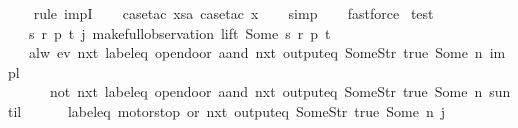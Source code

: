 \begin{isabellebody}
\ \ \isamarkupfalse%
\ {\isacharparenleft}rule\ impI{\isacharparenright}\isanewline
\ \ \isamarkupfalse%
\ {\isacharparenleft}case{\isacharunderscore}tac\ {\isachardoublequoteopen}xsa{\isachardoublequoteclose}{\isacharcomma}\ case{\isacharunderscore}tac\ x{}{\isacharparenright}\isanewline
\ \ \isamarkupfalse%
\ simp\isanewline
\ \ \isamarkupfalse%
\ fastforce%
\endisatagproof
{\isafoldproof}%
%
\isadelimproof
\isanewline
%
\endisadelimproof
\isanewline
{}\isamarkupfalse%
\ test\ {\isacharcolon}\isanewline
\ \ \ {\isachardoublequoteopen}{\isasymexists}s\ r\ p\ t{\isachardot}\ j{\isacharequal}\ make{\isacharunderscore}full{\isacharunderscore}observation\ lift\ {\isacharparenleft}Some\ s{\isacharparenright}\ r\ p\ t{\isachardoublequoteclose}\isanewline
\ \ \ {\isachardoublequoteopen}alw\ {\isacharparenleft}{\isacharparenleft}ev\ {\isacharparenleft}nxt\ {\isacharparenleft}{\isacharparenleft}label{\isacharunderscore}eq\ {\isacharprime}{\isacharprime}opendoor{\isacharprime}{\isacharprime}{\isacharparenright}\ aand\ {\isacharparenleft}nxt\ {\isacharparenleft}output{\isacharunderscore}eq\ {\isacharbrackleft}Some{\isacharparenleft}Str\ {\isacharprime}{\isacharprime}true{\isacharprime}{\isacharprime}{\isacharparenright}{\isacharcomma}\ Some\ n{\isacharbrackright}{\isacharparenright}{\isacharparenright}{\isacharparenright}{\isacharparenright}{\isacharparenright}\ impl\isanewline
\ \ \ \ \ \ {\isacharparenleft}{\isacharparenleft}not\ {\isacharparenleft}nxt\ {\isacharparenleft}{\isacharparenleft}label{\isacharunderscore}eq\ {\isacharprime}{\isacharprime}opendoor{\isacharprime}{\isacharprime}{\isacharparenright}\ aand\ {\isacharparenleft}nxt\ {\isacharparenleft}output{\isacharunderscore}eq\ {\isacharbrackleft}Some{\isacharparenleft}Str\ {\isacharprime}{\isacharprime}true{\isacharprime}{\isacharprime}{\isacharparenright}{\isacharcomma}\ Some\ n{\isacharbrackright}{\isacharparenright}{\isacharparenright}{\isacharparenright}{\isacharparenright}{\isacharparenright}\ suntil\isanewline
\ \ \ \ \ \ {\isacharparenleft}{\isacharparenleft}{\isacharparenleft}label{\isacharunderscore}eq\ {\isacharprime}{\isacharprime}motorstop{\isacharprime}{\isacharprime}{\isacharparenright}\ or\ {\isacharparenleft}nxt\ {\isacharparenleft}output{\isacharunderscore}eq\ {\isacharbrackleft}Some{\isacharparenleft}Str\ {\isacharprime}{\isacharprime}true{\isacharprime}{\isacharprime}{\isacharparenright}{\isacharcomma}\ Some\ n{\isacharbrackright}{\isacharparenright}{\isacharparenright}{\isacharparenright}{\isacharparenright}{\isacharparenright}{\isacharparenright}\ j{\isachardoublequoteclose}\isanewline

\end{isabellebody}
